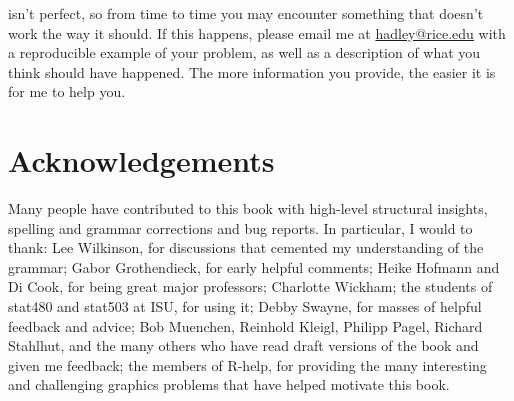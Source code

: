 \ggplot isn't perfect, so from time to time you may encounter something that doesn't work the way it should.  If this happens, please email me at \href{mailto:hadley@rice.edu}{hadley@rice.edu} with a reproducible example of your problem, as well as a description of what you think should have happened.  The more information you provide, the easier it is for me to help you.

\section{Acknowledgements}\label{sec:acknolwedgements}

Many people have contributed to this book with high-level structural insights, spelling and grammar corrections and bug reports.  In particular, I would to thank: Lee Wilkinson, for discussions that cemented my understanding of the grammar; Gabor Grothendieck, for early helpful comments; Heike Hofmann and Di Cook, for being great major professors; Charlotte Wickham; the students of stat480 and stat503 at ISU, for using it; Debby Swayne, for masses of helpful feedback and advice; Bob Muenchen, Reinhold Kleigl, Philipp Pagel, Richard Stahlhut, and the many others who have read draft versions of the book and given me feedback; the members of R-help, for providing the many interesting and challenging graphics problems that have helped motivate this book.



